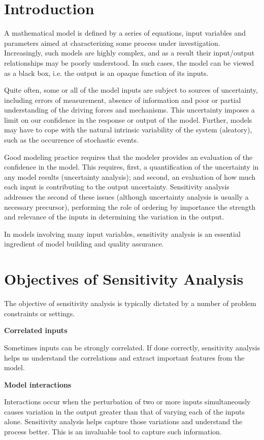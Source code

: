 \section{Introduction}
A mathematical model is defined by a series of equations, input variables and parameters aimed at characterizing some process under investigation. Increasingly, such models are highly complex, and as a result their input/output relationships may be poorly understood. In such cases, the model can be viewed as a black box, i.e. the output is an opaque function of its inputs.

Quite often, some or all of the model inputs are subject to sources of uncertainty, including errors of measurement, absence of information and poor or partial understanding of the driving forces and mechanisms. This uncertainty imposes a limit on our confidence in the response or output of the model. Further, models may have to cope with the natural intrinsic variability of the system (aleatory), such as the occurrence of stochastic events.

Good modeling practice requires that the modeler provides an evaluation of the confidence in the model. This requires, first, a quantification of the uncertainty in any model results (uncertainty analysis); and second, an evaluation of how much each input is contributing to the output uncertainty. Sensitivity analysis addresses the second of these issues (although uncertainty analysis is usually a necessary precursor), performing the role of ordering by importance the strength and relevance of the inputs in determining the variation in the output.

In models involving many input variables, sensitivity analysis is an essential ingredient of model building and quality assurance. 

\section{Objectives of Sensitivity Analysis}
The objective of sensitivity analysis is typically dictated by a number of problem constraints or settings.


\textbf{Correlated inputs}

Sometimes inputs can be strongly correlated. If done correctly, sensitivity analysis helps us understand the correlations and extract important features from the model.

\textbf{Model interactions }

Interactions occur when the perturbation of two or more inputs simultaneously causes variation in the output greater than that of varying each of the inputs alone. Sensitivity analysis helps capture those variations and understand the process better. This is an invaluable tool to capture such information.

